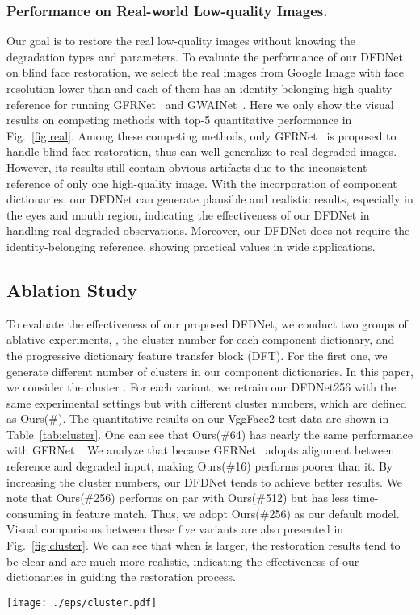 \documentclass[runningheads]{llncs}
\begin{document}
\subsubsection{Performance on Real-world Low-quality Images.} Our goal is to restore the real low-quality images without knowing the degradation types and parameters. To evaluate the performance of our DFDNet on blind face restoration, we select the real images from Google Image with face resolution lower than  and each of them has an identity-belonging high-quality reference for running GFRNet~\cite{li2018learning} and GWAINet~\cite{dogan2019exemplar}. Here we only show the visual results on competing methods with top-5 quantitative performance in Fig.~\ref{fig:real}. Among these competing methods, only GFRNet~\cite{li2018learning} is proposed to handle blind face restoration, thus can well generalize to real degraded images. However, its results still contain obvious artifacts due to the inconsistent reference of only one high-quality image. With the incorporation of component dictionaries, our DFDNet can generate plausible and realistic results, especially in the eyes and mouth region, indicating the effectiveness of our DFDNet in handling real degraded observations. Moreover, our DFDNet does not require the identity-belonging reference, showing practical values in wide applications.



\subsection{Ablation Study}
To evaluate the effectiveness of our proposed DFDNet, we conduct two groups of ablative experiments, \ie, the cluster number  for each component dictionary, and the progressive dictionary feature transfer block (DFT). For the first one, we generate different number of clusters in our component dictionaries. In this paper, we consider the cluster . For each variant, we retrain our DFDNet256 with the same experimental settings but with different cluster numbers, which are defined as Ours(\#). The quantitative results on our VggFace2 test data are shown in Table~\ref{tab:cluster}. One can see that Ours(\#64) has nearly the same performance with GFRNet~\cite{li2018learning}. We analyze that because GFRNet~\cite{li2018learning} adopts alignment between reference and degraded input, making Ours(\#16) performs poorer than it. By increasing the cluster numbers, our DFDNet tends to achieve better results. We note that Ours(\#256) performs on par with Ours(\#512) but has less time-consuming in feature match. Thus, we adopt Ours(\#256) as our default model. Visual comparisons between these five variants are also presented in Fig.~\ref{fig:cluster}. 
We can see that when  is larger, the restoration results tend to be clear and are much more realistic, indicating the effectiveness of our dictionaries in guiding the restoration process.
\begin{figure*}[t]
	\setlength{\abovecaptionskip}{3pt}
	\setlength{\belowcaptionskip}{-10pt}
	\centering
	\texttt{[image: ./eps/cluster.pdf]}
	\caption{Restoration results of our DFDNet with different cluster numbers.}
	\label{fig:cluster}
\end{figure*}
\end{document}
